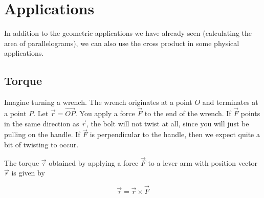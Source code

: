 \documentclass{ximera}
\begin{document}
\section{Applications}

In addition to the geometric applications we have already seen (calculating the area of parallelograms), we can also use the cross product in some physical applications.

\subsection{Torque}

Imagine turning a wrench.  The wrench originates at a point $O$ and terminates at a point $P$.  Let $\vec{r} = \overrightarrow{OP}$.  You apply a force $\vec{F}$ to the end of the wrench.  If $\vec{F}$ points in the same direction as $\vec{r}$, the bolt will not twist at all, since you will just be pulling on the handle.  If $\vec{F}$ is perpendicular to the handle, then we expect quite a bit of twisting to occur.

\begin{definition}
	The torque $\vec{\tau}$ obtained by applying a force $\vec{F}$ to a lever arm with position vector $\vec{r}$ is given by
	
	\[
	\vec{\tau} = \vec{r} \times \vec{F} 
	\]
\end{definition}
\end{document}
